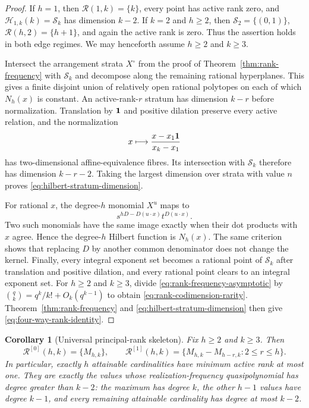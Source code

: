 \documentclass[11pt,reqno]{amsart}
\newtheorem{corollary}[theorem]{Corollary}
\theoremstyle{definition}
\theoremstyle{remark}
\newcommand{\Rcal}{\mathcal R}
\begin{document}
\begin{proof}
If $h=1$, then $\mathcal R(1,k)=\{k\}$, every point has active rank zero,
and $\mathcal H_{1,k}(k)=\mathcal S_k$ has dimension $k-2$.  If $k=2$ and
$h\geq2$, then $\mathcal S_2=\{(0,1)\}$,
$\mathcal R(h,2)=\{h+1\}$, and again the active rank is zero.  Thus the
assertion holds in both edge regimes.  We may henceforth assume
$h\geq2$ and $k\geq3$.

Intersect the arrangement strata $X^\circ$ from the proof of
Theorem~\ref{thm:rank-frequency} with $\mathcal S_k$ and decompose along the
remaining rational hyperplanes.  This gives a finite disjoint union of
relatively open rational polytopes on each of which $N_h(x)$ is constant.
An active-rank-$r$ stratum has dimension $k-r$ before normalization.
Translation by ${\bf1}$ and positive dilation preserve every active relation,
and the normalization
\[
 x\longmapsto\frac{x-x_1{\bf1}}{x_k-x_1}
\]
has two-dimensional affine-equivalence fibres.  Its intersection with
$\mathcal S_k$ therefore has dimension $k-r-2$.  Taking the largest
dimension over strata with value $n$ proves
\eqref{eq:hilbert-stratum-dimension}.

For rational $x$, the degree-$h$ monomial $X^u$ maps to
\[
 s^{hD-D(u\cdot x)}t^{D(u\cdot x)}.
\]
Two such monomials have the same image exactly when their dot products with
$x$ agree.  Hence the degree-$h$ Hilbert function is $N_h(x)$.  The same
criterion shows that replacing $D$ by another common denominator does not
change the kernel.  Finally, every integral exponent set becomes a rational
point of $\mathcal S_k$ after translation and positive dilation, and every
rational point clears to an integral exponent set.
For $h\geq2$ and $k\geq3$, divide
\eqref{eq:rank-frequency-asymptotic} by
$\binom qk=q^k/k!+O_k(q^{k-1})$ to obtain
\eqref{eq:rank-codimension-rarity}.  Theorem~\ref{thm:rank-frequency} and
\eqref{eq:hilbert-stratum-dimension} then give
\eqref{eq:four-way-rank-identity}.
\end{proof}

\begin{corollary}[Universal principal-rank skeleton]
\label{cor:universal-principal-skeleton}
Fix $h\geq2$ and $k\geq3$.  Then
\begin{equation}\label{eq:universal-principal-skeleton}
 \Rcal^{[0]}(h,k)=\{M_{h,k}\},
 \qquad
 \Rcal^{[1]}(h,k)
 =\{M_{h,k}-M_{h-r,k}:2\leq r\leq h\}.
\end{equation}
In particular, exactly $h$ attainable cardinalities have minimum active
rank at most one.  They are exactly the values whose realization-frequency
quasipolynomial has degree greater than $k-2$: the maximum has degree $k$,
the other $h-1$ values have degree $k-1$, and every remaining attainable
cardinality has degree at most $k-2$.
\end{corollary}
\end{document}
